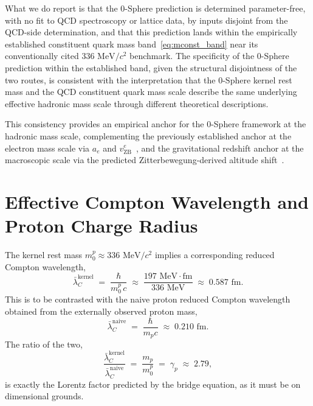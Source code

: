 \documentclass[%
 reprint, amsmath,amssymb, aps, prc, ]{revtex4-2}
\numberwithin{equation}{section}
\newcommand{\vZB}{v_{\text{ZB}}}
\begin{document}
What we do report is that the 0-Sphere prediction is determined parameter-free, with no fit to QCD spectroscopy or lattice data, by inputs disjoint from the QCD-side determination, and that this prediction lands within the empirically established constituent quark mass band~\eqref{eq:mconst_band} near its conventionally cited $336 \text{ MeV}/c^2$ benchmark.
The specificity of the 0-Sphere prediction within the established band, given the structural disjointness of the two routes, is consistent with the interpretation that the 0-Sphere kernel rest mass and the QCD constituent quark mass scale describe the same underlying effective hadronic mass scale through different theoretical descriptions.

This consistency provides an empirical anchor for the 0-Sphere framework at the hadronic mass scale, complementing the previously established anchor at the electron mass scale via $a_e$ and $\vZB^e$~\cite{Hanamura10}, and the gravitational redshift anchor at the macroscopic scale via the predicted Zitterbewegung-derived altitude shift~\cite{Hanamura22}.

\section{Effective Compton Wavelength and Proton Charge Radius}
\label{sec:compton}

The kernel rest mass $m_0^p \approx 336 \text{ MeV}/c^2$ implies a corresponding reduced Compton wavelength,
\begin{equation}
\bar{\lambda}_C^{\text{kernel}} \;=\; \frac{\hbar}{m_0^p \, c} \;\approx\; \frac{197 \text{ MeV} \cdot \text{fm}}{336 \text{ MeV}} \;\approx\; 0.587 \text{ fm}.
\label{eq:lambdaC_kernel}
\end{equation}
This is to be contrasted with the naive proton reduced Compton wavelength obtained from the externally observed proton mass,
\begin{equation}
\bar{\lambda}_C^{\text{naive}} \;=\; \frac{\hbar}{m_p c} \;\approx\; 0.210 \text{ fm}.
\label{eq:lambdaC_naive}
\end{equation}
The ratio of the two,
\begin{equation}
\frac{\bar{\lambda}_C^{\text{kernel}}}{\bar{\lambda}_C^{\text{naive}}} \;=\; \frac{m_p}{m_0^p} \;=\; \gamma_p \;\approx\; 2.79,
\label{eq:lambdaC_ratio}
\end{equation}
is exactly the Lorentz factor predicted by the bridge equation, as it must be on dimensional grounds.
\end{document}
